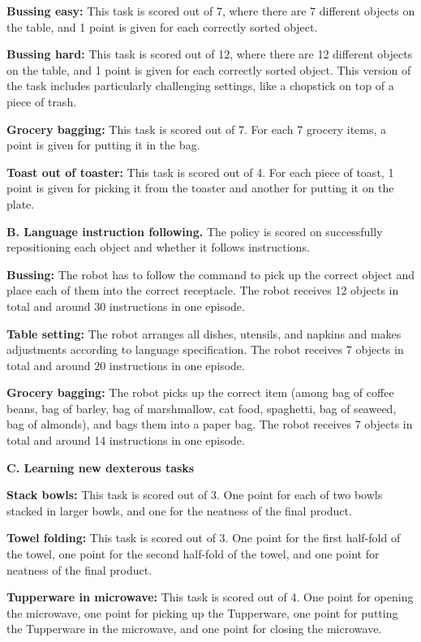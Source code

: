 \noindent \textbf{Bussing easy:} This task is scored out of 7, where there are 7 different objects on the table, and 1 point is given for each correctly sorted object.

\noindent \textbf{Bussing hard:} This task is scored out of 12, where there are 12 different objects on the table, and 1 point is given for each correctly sorted object. This version of the task includes particularly challenging settings, like a chopstick on top of a piece of trash. 

\noindent \textbf{Grocery bagging:} This task is scored out of 7. For each 7 grocery items, a point is given for putting it in the bag. 

\noindent \textbf{Toast out of toaster:} This task is scored out of 4. For each piece of toast, 1 point is given for picking it from the toaster and another for putting it on the plate. 

\noindent \textbf{B. Language instruction following.} The policy is scored on successfully repositioning each object and whether it follows instructions.

\noindent \textbf{Bussing:} The robot has to follow the command to pick up the correct object and place each of them into the correct receptacle. The robot receives 12 objects in total and around 30 instructions in one episode.

\noindent \textbf{Table setting:} The robot arranges all dishes, utensils, and napkins and makes adjustments according to language specification. The robot receives 7 objects in total and around 20 instructions in one episode.

\noindent \textbf{Grocery bagging:} The robot picks up the correct item (among bag of coffee beans, bag of barley, bag of marshmallow, cat food, spaghetti, bag of seaweed, bag of almonds), and bags them into a paper bag. The robot receives 7 objects in total and around 14 instructions in one episode.

\noindent \textbf{C. Learning new dexterous tasks}

\noindent \textbf{Stack bowls:} This task is scored out of 3. One point for each of two bowls stacked in larger bowls, and one for the neatness of the final product.

\noindent \textbf{Towel folding:} This task is scored out of 3. One point for the first half-fold of the towel, one point for the second half-fold of the towel, and one point for neatness of the final product.

\noindent \textbf{Tupperware in microwave:} This task is scored out of 4. One point for opening the microwave, one point for picking up the Tupperware, one point for putting the Tupperware in the microwave, and one point for closing the microwave.


